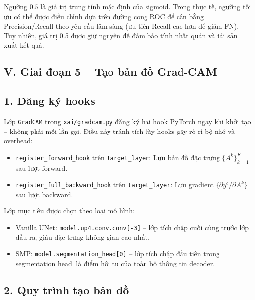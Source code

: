 Ngưỡng 0.5 là giá trị trung tính mặc định của sigmoid. Trong thực tế, ngưỡng tối ưu có thể được điều chỉnh dựa trên đường cong ROC để cân bằng Precision/Recall theo yêu cầu lâm sàng (ưu tiên Recall cao hơn để giảm FN). Tuy nhiên, giá trị 0.5 được giữ nguyên để đảm bảo tính nhất quán và tái sản xuất kết quả.

\subsection*{V. Giai đoạn 5 -- Tạo bản đồ Grad-CAM}

\subsection*{1. Đăng ký hooks}

Lớp \texttt{GradCAM} trong \texttt{xai/gradcam.py} đăng ký hai hook PyTorch ngay khi khởi tạo -- không phải mỗi lần gọi. Điều này tránh tích lũy hooks gây rò rỉ bộ nhớ và overhead:

\begin{sloppypar}
\begin{itemize}
    \item \texttt{register\_forward\_hook} trên \texttt{target\_layer}: Lưu bản đồ đặc trưng $\{A^k\}_{k=1}^{K}$ sau lượt forward.
    \item \texttt{register\_full\_backward\_hook} trên \texttt{target\_layer}: Lưu gradient $\{\partial y^c / \partial A^k\}$ sau lượt backward.
\end{itemize}
\end{sloppypar}

Lớp mục tiêu được chọn theo loại mô hình:
\begin{itemize}
    \item Vanilla UNet: \texttt{model.up4.conv.conv[-3]} -- lớp tích chập cuối cùng trước lớp đầu ra, giàu đặc trưng không gian cao nhất.
    \item SMP: \texttt{model.segmentation\_head[0]} -- lớp tích chập đầu tiên trong segmentation head, là điểm hội tụ của toàn bộ thông tin decoder.
\end{itemize}

\subsection*{2. Quy trình tạo bản đồ}

